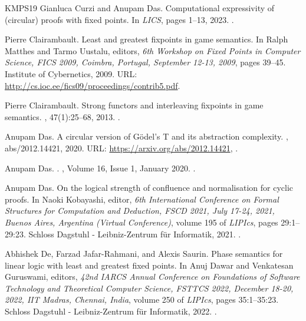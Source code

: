 \documentclass[10pt,a4paper]{amsart}
\theoremstyle{plain}
\theoremstyle{definition}
\theoremstyle{plain}
\theoremstyle{definition} %
\begin{document}
\begin{thebibliography}{KMPS19}
Gianluca Curzi and Anupam Das.
\newblock Computational expressivity of (circular) proofs with fixed points.
\newblock In {\em {LICS}}, pages 1--13, 2023.
\newblock \href {https://doi.org/10.1109/LICS56636.2023.10175772} {}.

Pierre Clairambault.
\newblock Least and greatest fixpoints in game semantics.
\newblock In Ralph Matthes and Tarmo Uustalu, editors, {\em 6th Workshop on Fixed Points in Computer Science, {FICS} 2009, Coimbra, Portugal, September 12-13, 2009}, pages 39--45. Institute of Cybernetics, 2009.
\newblock URL: \url{http://cs.ioc.ee/fics09/proceedings/contrib5.pdf}.

Pierre Clairambault.
\newblock Strong functors and interleaving fixpoints in game semantics.
, 47(1):25--68, 2013.
\newblock \href {https://doi.org/10.1051/ita/2012028} {}.

Anupam Das.
\newblock A circular version of {G}{\"{o}}del's {T} and its abstraction complexity.
, abs/2012.14421, 2020.
\newblock URL: \url{https://arxiv.org/abs/2012.14421}, \href {https://arxiv.org/abs/2012.14421} {}.

Anupam Das.
.
, {Volume 16, Issue 1}, January 2020.
\newblock \href {https://doi.org/10.23638/LMCS-16(1:1)2020} {}.

Anupam Das.
\newblock On the logical strength of confluence and normalisation for cyclic proofs.
\newblock In Naoki Kobayashi, editor, {\em 6th International Conference on Formal Structures for Computation and Deduction, {FSCD} 2021, July 17-24, 2021, Buenos Aires, Argentina (Virtual Conference)}, volume 195 of {\em LIPIcs}, pages 29:1--29:23. Schloss Dagstuhl - Leibniz-Zentrum f{\"{u}}r Informatik, 2021.
\newblock \href {https://doi.org/10.4230/LIPIcs.FSCD.2021.29} {}.

Abhishek De, Farzad Jafar{-}Rahmani, and Alexis Saurin.
\newblock Phase semantics for linear logic with least and greatest fixed points.
\newblock In Anuj Dawar and Venkatesan Guruswami, editors, {\em 42nd {IARCS} Annual Conference on Foundations of Software Technology and Theoretical Computer Science, {FSTTCS} 2022, December 18-20, 2022, {IIT} Madras, Chennai, India}, volume 250 of {\em LIPIcs}, pages 35:1--35:23. Schloss Dagstuhl - Leibniz-Zentrum f{\"{u}}r Informatik, 2022.
\newblock \href {https://doi.org/10.4230/LIPIcs.FSTTCS.2022.35} {}.


\end{thebibliography}
\end{document}
